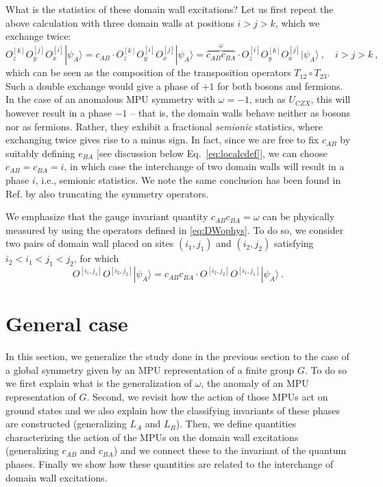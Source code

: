 \documentclass[aps,pra,export,nofootinbib]{revtex4-2}
\begin{document}
What is the statistics of these domain wall excitations? Let us first repeat the above calculation with three domain walls at positions $i>j>k$, which we exchange twice:
\begin{equation}\label{DWstat}
O^{[k]}_z O^{[j]}_y O^{[i]}_x | \psi_A \rangle = c_{AB}\cdot O^{[k]}_z  O^{[i]}_y O^{[j]}_x | \psi_A \rangle  = \overbrace{c_{AB}c_{BA}}^{\omega} \cdot O^{[i]}_z  O^{[k]}_y  O^{[j]}_x | \psi_A \rangle\ ,    \quad i > j > k \ ,
\end{equation}
which can be seen as the composition of the transposition operators $T_{12}\circ T_{23}$. 
Such a double exchange would give a phase of $+1$ for both bosons and fermions. In the case of an anomalous MPU symmetry with $\omega=-1$, such as $U_{CZX}$, this will however result in a phase $-1$ -- that is, the domain walls behave neither as bosons nor as fermions. Rather, they exhibit a fractional \emph{semionic} statistics, where exchanging twice gives rise to a minus sign. In fact, since we are free to fix $c_{AB}$ by suitably defining $e_{BA}$ [see discussion below Eq.~\eqref{eq:localcdef}], we can choose $c_{AB}=c_{BA}=i$, in which case the interchange of two domain walls will result in a phase $i$, i.e., semionic statistics. We note the same conclusion has been found in Ref.\cite{Chatterjee23} by also truncating the symmetry operators.



We emphasize that the gauge invariant quantity $c_{AB}c_{BA}= \omega $ can be physically measured by using the operators defined in \eqref{eq:DWophys}. To do so, we consider two pairs of domain wall placed on sites $(i_1,j_1)$ and $(i_2,j_2)$ satisfying $i_2 < i_1 < j_1 < j_2$, for which  
\begin{equation}\label{signphysop}
   O^{[i_1,j_1]} O^{[i_2,j_2]}| \psi_A \rangle  =  c_{AB}c_{BA}\cdot O^{[i_2,j_2]}  O^{[i_1,j_1]} | \psi_A \rangle   \ .
\end{equation} 


%
\section{General case}

In this section, we generalize the study done in the previous section to the case of a global symmetry given by an MPU representation of a finite group $G$. To do so we first explain what is the generalization of $\omega$, the anomaly of an MPU representation of $G$. Second, we revisit how the action of those MPUs act on ground states and we also explain how the classifying invariants of these phases are constructed (generalizing $L_A$ and $L_B$). Then, we define quantities characterizing the action of the MPUs on the domain wall excitations (generalizing $c_{AB}$ and $c_{BA}$) and  we connect these to the invariant of the quantum phases. Finally we show how these quantities are related to the interchange of domain wall excitations. 
\end{document}
